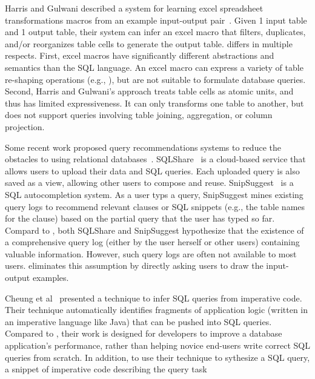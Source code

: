 Harris and Gulwani described a system for learning excel
spreadsheet transformations macros from an example
input-output pair~\cite{Harris:2011}. Given 1 input table and 1 output
table, their system can infer an excel macro that filters,
duplicates, and/or reorganizes table cells to generate the output table.
\ourtool differs in multiple respects.
First, excel macros have significantly different
abstractions and semantics than the SQL language.
An excel macro can express a variety of table re-shaping operations
(e.g., ), but
are not suitable to formulate database queries.
Second, Harris and Gulwani's approach treats table cells
as atomic units, and thus has limited expressiveness.
It can only transforms one table to another, but
does not support queries involving table joining, aggregation,
or column projection. 




Some recent work proposed query recommendations systems to reduce
the obstacles to using relational databases~\cite{Howe:2011, Khoussainova:2010}. 
SQLShare~\cite{Howe:2011} is a cloud-based service that allows
users to upload their data and SQL queries. 
Each uploaded query is also saved as a view, allowing other users
to compose and reuse. SnipSuggest~\cite{Khoussainova:2010} is a SQL autocompletion
system. As a user typs a query, SnipSuggest mines existing query
logs to recommend relevant clauses or SQL snippets (e.g., the table
names for the  clause) based on the partial query that
the user has typed so far.
Compard to \ourtool, both SQLShare and SnipSuggest hypothesize that the
existence of a comprehensive query log (either by the user herself or other users)
containing valuable information.
However, such query logs are often not available to most users.
\ourtool eliminates this assumption by directly asking users to
draw the input-output examples.


Cheung et al~\cite{abs-1208-2013} presented a technique to infer SQL
queries from imperative code. Their technique automatically identifies
fragments of application logic (written in an imperative language
like Java) that can be pushed into SQL queries. 
Compared to \ourtool, their work is designed for developers
to improve a database application's performance,
rather than helping novice end-users
write correct SQL queries from scratch. In addition,
to use their technique to sythesize a SQL query, 
a snippet of imperative code describing the query task

